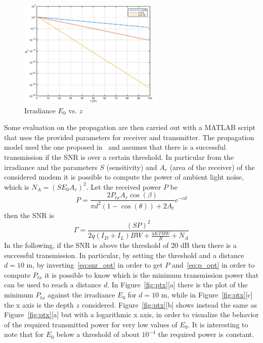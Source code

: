 \documentclass[10pt]{article}
\begin{document}
\begin{figure}[h!]
	\centering
	\includegraphics[width = 0.6\textwidth]{e0_z}
	\caption{Irradiance $E_0$ vs. $z$}
	\label{fig:e0zm}
\end{figure}

Some evaluation on the propagation are then carried out with a MATLAB script that uses the provided parameters for receiver and transmitter. The propagation model used the one proposed in~\cite{optmodel} and assumes that there is a successful transmission if the SNR is over a certain threshold. In particular from the irradiance and the parameters $S$ (sensitivity) and $A_r$ (area of the receiver) of the considered modem it is possible to compute the power of ambient light noise, which is $N_A = (S E_0 A_r)^2$. Let the received power $P$ be
\begin{equation}
	P = \frac{2 P_{tx} A_r \cos(\beta)}{\pi d^2 (1-\cos(\theta)) + 2 A_t}e^{-cd}
	\label{eq:p_opt}
\end{equation}
then the SNR is
\begin{equation}
	\Gamma  = \frac{(SP)^2}{2q(I_D + I_L)BW + \frac{4KTBW}{R} + N_A}
	\label{eq:snr_opt}
\end{equation}
In the following, if the SNR is above the threshold of 20 dB then there is a successful transmission. In particular, by setting the threshold and a distance $d = 10$ m, by inverting~\eqref{eq:snr_opt} in order to get $P$ and~\eqref{eq:p_opt} in order to compute $P_{tx}$ it is possible to know which is the minimum transmission power that can be used to reach a distance $d$. In Figure~\ref{fig:ptx}[a] there is the plot of the minimum $P_{tx}$ against the irradiance $E_0$ for $d = 10$ m, while in Figure~\ref{fig:ptx}[c] the x axis is the depth $z$ considered. Figure~\ref{fig:ptx}[b] shows instead the same as Figure~\ref{fig:ptx}[a] but with a logarithmic x axis, in order to visualize the behavior of the required transmitted power for very low values of $E_0$. It is interesting to note that for $E_0$ below a threshold of about $10^{-4}$ the required power is constant.
\end{document}

